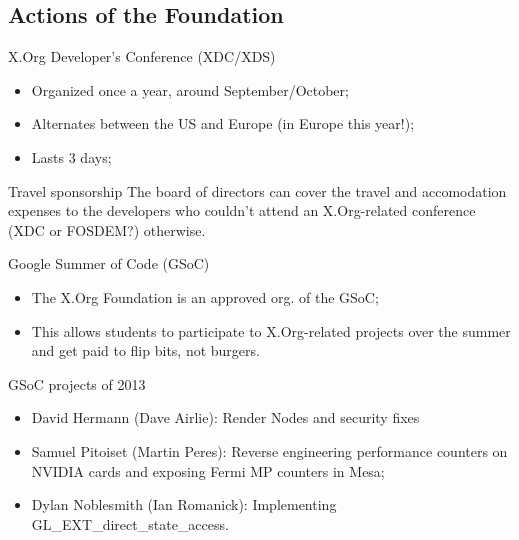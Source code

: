 \documentclass{beamer}
\begin{document}
		\subsection{Actions of the Foundation}
		\begin{frame}
			\begin{block}{X.Org Developer's Conference (XDC/XDS)}
				\begin{itemize}
					\item Organized once a year, around
September/October;
					\item Alternates between the US and
Europe (in Europe this year!);
					\item Lasts 3 days;
				\end{itemize}
			\end{block}

			\begin{block}{Travel sponsorship}
				The board of directors can cover the travel and
accomodation expenses to the developers who couldn't attend an X.Org-related
conference (XDC or FOSDEM?) otherwise.
			\end{block}
		\end{frame}

		\begin{frame}
			\begin{block}{Google Summer of Code (GSoC)}
				\begin{itemize}
					\item The X.Org Foundation is an
approved org. of the GSoC;
					\item This allows students to participate to
X.Org-related projects over the summer and get paid to flip bits, not burgers.
				\end{itemize}
			\end{block}

			\begin{block}{GSoC projects of 2013}
				\begin{itemize}
					\item David Hermann (Dave Airlie):
Render Nodes and security fixes
					\item Samuel Pitoiset (Martin Peres):
Reverse engineering performance counters on NVIDIA cards and exposing Fermi MP
counters in Mesa;
					\item Dylan Noblesmith (Ian Romanick):
Implementing GL\_EXT\_direct\_state\_access.
				\end{itemize}
			\end{block}
		\end{frame}
\end{document}
